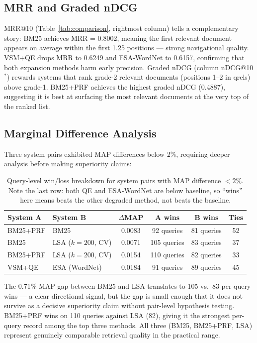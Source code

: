 \documentclass{svproc}
\begin{document}
    \subsection{MRR and Graded nDCG}

    MRR@10 (Table~\ref{tab:comparison}, rightmost column) tells a complementary story: BM25 achieves MRR = 0.8002, meaning the first relevant document appears on average within the first 1.25 positions — strong navigational quality. VSM+QE drops MRR to 0.6249 and ESA-WordNet to 0.6157, confirming that both expansion methods harm early precision. Graded nDCG (column nDCG@10$^*$) rewards systems that rank grade-2 relevant documents (positions 1--2 in qrels) above grade-1. BM25+PRF achieves the highest graded nDCG (0.4887), suggesting it is best at surfacing the most relevant documents at the very top of the ranked list.

    \subsection{Marginal Difference Analysis}

    Three system pairs exhibited MAP differences below 2\%, requiring deeper analysis before making superiority claims:

    \begin{table}[H]
    \centering
    \renewcommand{\arraystretch}{1.2}
    \begin{tabular}{llcccc}
    \toprule
    \textbf{System A} & \textbf{System B} & \textbf{$\Delta$MAP} & \textbf{A wins} & \textbf{B wins} & \textbf{Ties} \\
    \midrule
    BM25+PRF & BM25            & 0.0083 & 92 queries & 81 queries  & 52 \\
    BM25     & LSA ($k{=}200$, CV) & 0.0071 & 105 queries & 83 queries & 37 \\
    BM25+PRF & LSA ($k{=}200$, CV) & 0.0154 & 110 queries & 82 queries & 33 \\
    VSM+QE   & ESA (WordNet)   & 0.0184 & 91 queries  & 89 queries  & 45 \\
    \bottomrule
    \end{tabular}
    \caption{Query-level win/loss breakdown for system pairs with MAP difference $<2\%$. Note the last row: both QE and ESA-WordNet are below baseline, so ``wins'' here means beats the other degraded method, not beats the baseline.}
    \end{table}

    The 0.71\% MAP gap between BM25 and LSA translates to 105 vs.\ 83 per-query wins — a clear directional signal, but the gap is small enough that it does not survive as a decisive superiority claim without pair-level hypothesis testing. BM25+PRF wins on 110 queries against LSA (82), giving it the strongest per-query record among the top three methods. All three (BM25, BM25+PRF, LSA) represent genuinely comparable retrieval quality in the practical range.
\end{document}
